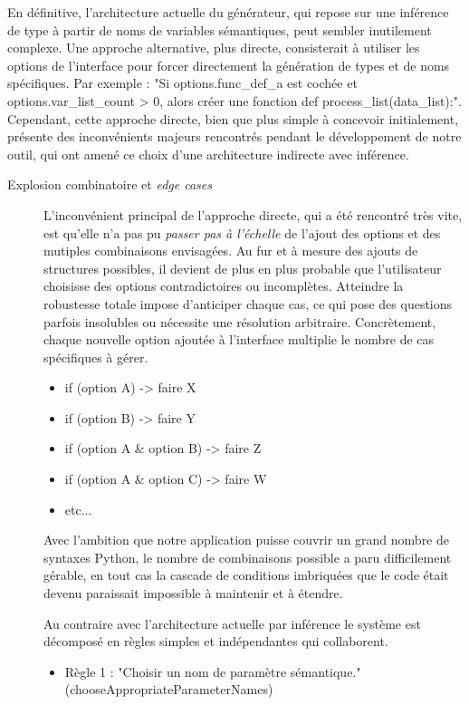 \documentclass[11pt,a4paper]{article}
\begin{document}
En définitive, l'architecture actuelle du générateur, qui repose sur une inférence de type à partir de noms de variables sémantiques, peut sembler inutilement complexe. Une approche alternative, plus directe, consisterait à utiliser les options de l'interface pour forcer directement la génération de types et de noms spécifiques. Par exemple : "Si options.func\_def\_a est cochée et options.var\_list\_count > 0, alors créer une fonction def process\_list(data\_list):".
Cependant, cette approche directe, bien que plus simple à concevoir initialement, présente des inconvénients majeurs rencontrés pendant le développement de notre outil, qui ont amené ce choix d'une architecture indirecte avec inférence.
\begin{description}
    \item[Explosion combinatoire et \textit{edge cases}] L'inconvénient principal de l'approche directe, qui a été rencontré très vite, est qu'elle n'a pas pu \textit{passer pas à l'échelle} de l'ajout des options et des mutiples combinaisons envisagées. Au fur et à mesure des ajouts de structures possibles, il devient de plus en plus probable que l'utilisateur choisisse des options contradictoires ou incomplètes. Atteindre la robustesse totale impose d'anticiper chaque cas, ce qui pose des questions parfois insolubles ou nécessite une résolution arbitraire. Concrètement, chaque nouvelle option ajoutée à l'interface multiplie le nombre de cas spécifiques à gérer.
    \begin{itemize}
        \item if (option A) -> faire X
        \item if (option B) -> faire Y
        \item if (option A \& option B) -> faire Z
        \item if (option A \& option C) -> faire W
        \item etc... 
    \end{itemize}
    Avec l'ambition que notre application puisse couvrir un grand nombre de syntaxes Python, le nombre de combinaisons possible a paru difficilement gérable, en tout cas la cascade de conditions imbriquées que le code était devenu paraissait impossible à maintenir et à étendre. \par Au contraire avec l'architecture actuelle par inférence le système est décomposé en règles simples et indépendantes qui collaborent.
    \begin{itemize}
        \item Règle 1 : "Choisir un nom de paramètre sémantique." (chooseAppropriateParameterNames)

\end{itemize}
\end{description}
\end{document}
